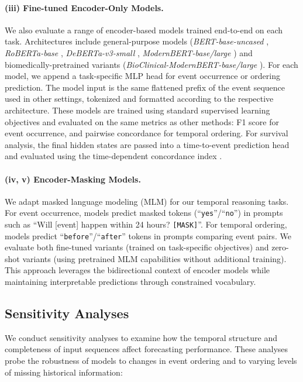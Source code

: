 \paragraph{(iii) Fine-tuned Encoder-Only Models.}  
We also evaluate a range of encoder-based models trained end-to-end on each task. 
Architectures include general-purpose models (\textit{BERT-base-uncased} \citep{devlin2019bert}, \textit{RoBERTa-base} \citep{liu2019roberta}, \textit{DeBERTa-v3-small} \citep{he2021debertav3}, \textit{ModernBERT-base/large} \citep{warner2024smarter}) and biomedically-pretrained variants (\textit{BioClinical-ModernBERT-base/large} \citep{sounack2025bioclinical}).
For each model, we append a task-specific MLP head for event occurrence or ordering prediction. 
The model input is the same flattened prefix of the event sequence used in other settings, tokenized and formatted according to the respective architecture. 
These models are trained using standard supervised learning objectives and evaluated on the same metrics as other methods: F1 score for event occurrence, and pairwise concordance for temporal ordering. 
For survival analysis, the final hidden states are passed into a time-to-event prediction head and evaluated using the time-dependent concordance index \citep{antolini2005time}.

\paragraph{(iv, v) Encoder-Masking Models.}
We adapt masked language modeling (MLM) for our temporal reasoning tasks. For event occurrence, models predict masked tokens (``\texttt{yes}''/``\texttt{no}'') in prompts such as ``Will [event] happen within 24 hours? \texttt{[MASK]}''. For temporal ordering, models predict ``\texttt{before}''/``\texttt{after}'' tokens in prompts comparing event pairs. We evaluate both fine-tuned variants (trained on task-specific objectives) and zero-shot variants (using pretrained MLM capabilities without additional training). This approach leverages the bidirectional context of encoder models while maintaining interpretable predictions through constrained vocabulary.

\vspace{-.5em}
\subsection{Sensitivity Analyses}
\vspace{-.25em}
We conduct sensitivity analyses to examine how the temporal structure and completeness of input sequences affect forecasting performance. These analyses probe the robustness of models to changes in event ordering and to varying levels of missing historical information:

